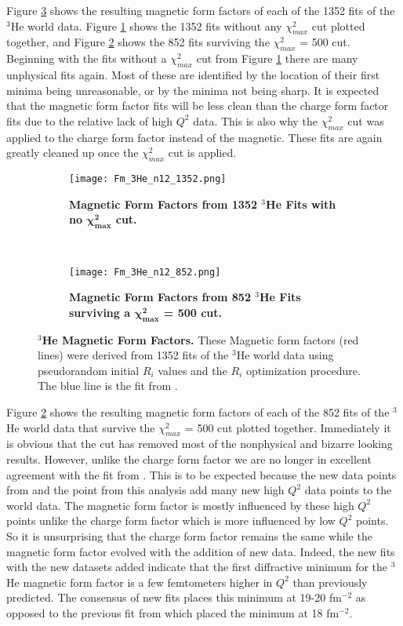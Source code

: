 Figure \ref{fig:3he_fm} shows the resulting magnetic form factors of each of the 1352 fits of the $^3$He world data. Figure \ref{fig:3he_fm_no_cut} shows the 1352 fits without any $\chi^2_{max}$ cut plotted together, and Figure \ref{fig:3he_fm_cut} shows the 852 fits surviving the $\chi^2_{max}$ = 500 cut. Beginning with the fits without a $\chi^2_{max}$ cut from Figure \ref{fig:3he_fm_no_cut} there are many unphysical fits again. Most of these are identified by the location of their first minima being unreasonable, or by the minima not being sharp. It is expected that the magnetic form factor fits will be less clean than the charge form factor fits due to the relative lack of high $Q^2$ data. This is also why the $\chi^2_{max}$ cut was applied to the charge form factor instead of the magnetic. These fits are again greatly cleaned up once the $\chi^2_{max}$ cut is applied.

\begin{figure}[!ht]
\begin{subfigure}{1.\textwidth}
  \centering
  \texttt{[image: Fm\_3He\_n12\_1352.png]}
  \caption{\bf{Magnetic Form Factors from 1352 $^3$He Fits with no $\boldsymbol{\chi^2_{max}}$ cut.}}
  \label{fig:3he_fm_no_cut}
\end{subfigure}\\
\begin{subfigure}{1.\textwidth}
  \centering
  \texttt{[image: Fm\_3He\_n12\_852.png]}
  \caption{\bf{Magnetic Form Factors from 852 $^3$He Fits surviving a $\boldsymbol{\chi^2_{max}}$ = 500 cut.}}
  \label{fig:3he_fm_cut}
\end{subfigure}
\caption[$^3$He Magnetic Form Factors] {
{\bf{$^3$He Magnetic Form Factors.}} These Magnetic form factors (red lines) were derived from 1352 fits of the $^3$He world data using pseudorandom initial $R_i$ values and the $R_i$ optimization procedure. The blue line is the fit from \cite{Article:Amroun}.}
\label{fig:3he_fm}
\end{figure}

Figure \ref{fig:3he_fm_cut} shows the resulting magnetic form factors of each of the 852 fits of the $^3$He world data that survive the $\chi^2_{max}$ = 500 cut plotted together. Immediately it is obvious that the cut has removed most of the nonphysical and bizarre looking results. However, unlike the charge form factor we are no longer in excellent agreement with the fit from \cite{Article:Amroun}. This is to be expected because the new data points from \cite{Article:Alex} and the point from this analysis add many new high $Q^2$ data points to the world data. The magnetic form factor is mostly influenced by these high $Q^2$ points unlike the charge form factor which is more influenced by low $Q^2$ points. So it is unsurprising that the charge form factor remains the same while the magnetic form factor evolved with the addition of new data. Indeed, the new fits with the new datasets added indicate that the first diffractive minimum for the $^3$He magnetic form factor is a few femtometers higher in $Q^2$ than previously predicted. The consensus of new fits places this minimum at 19-20 fm$^{-2}$ as opposed to the previous fit from \cite{Article:Amroun} which placed the minimum at 18 fm$^{-2}$.  

